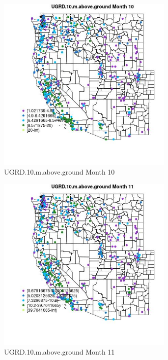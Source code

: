 \begin{figure} 
\centering  
\includegraphics[width=0.77\textwidth]{Code_Outputs/ML_input_report_ML_input_PM25_Step5_part_d_de_duplicated_aves_ML_input_MapObsMo10UGRD10maboveground.jpg} 
\caption{\label{fig:ML_input_report_ML_input_PM25_Step5_part_d_de_duplicated_aves_ML_inputMapObsMo10UGRD10maboveground}UGRD.10.m.above.ground Month 10} 
\end{figure} 
 

\begin{figure} 
\centering  
\includegraphics[width=0.77\textwidth]{Code_Outputs/ML_input_report_ML_input_PM25_Step5_part_d_de_duplicated_aves_ML_input_MapObsMo11UGRD10maboveground.jpg} 
\caption{\label{fig:ML_input_report_ML_input_PM25_Step5_part_d_de_duplicated_aves_ML_inputMapObsMo11UGRD10maboveground}UGRD.10.m.above.ground Month 11} 
\end{figure} 
 

